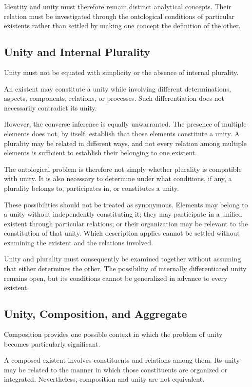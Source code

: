 Identity and unity must therefore remain distinct
analytical concepts. Their relation must be
investigated through the ontological conditions
of particular existents rather than settled by
making one concept the definition of the other.

\subsection{Unity and Internal Plurality}

Unity must not be equated with simplicity or
the absence of internal plurality.

An existent may constitute a unity while involving
different determinations, aspects, components,
relations, or processes. Such differentiation
does not necessarily contradict its unity.

However, the converse inference is equally
unwarranted. The presence of multiple elements
does not, by itself, establish that those elements
constitute a unity. A plurality may be related
in different ways, and not every relation among
multiple elements is sufficient to establish
their belonging to one existent.

The ontological problem is therefore not simply
whether plurality is compatible with unity.
It is also necessary to determine under what
conditions, if any, a plurality belongs to,
participates in, or constitutes a unity.

These possibilities should not be treated as
synonymous. Elements may belong to a unity
without independently constituting it; they
may participate in a unified existent through
particular relations; or their organization may
be relevant to the constitution of that unity.
Which description applies cannot be settled
without examining the existent and the
relations involved.

Unity and plurality must consequently be
examined together without assuming that
either determines the other. The possibility
of internally differentiated unity remains
open, but its conditions cannot be generalized
in advance to every existent.

\subsection{Unity, Composition, and Aggregate}

Composition provides one possible context
in which the problem of unity becomes
particularly significant.

A composed existent involves constituents
and relations among them. Its unity may
be related to the manner in which those
constituents are organized or integrated.
Nevertheless, composition and unity are
not equivalent.


